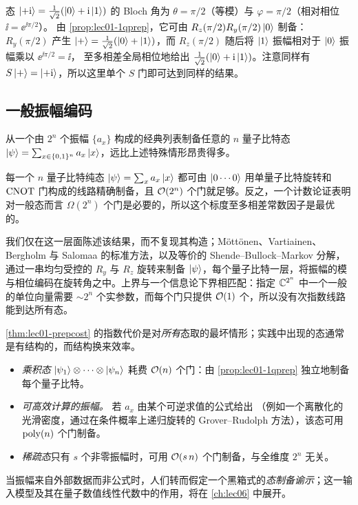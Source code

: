 \begin{example}[制备 $\ket{+\ii}$]\label{exa:lec01-prepplusi}
态 $\ket{+\mathrm{i}}=\tfrac{1}{\sqrt2}(\ket{0}+\mathrm{i}\ket{1})$ 的 Bloch 角为
$\theta=\pi/2$（等模）与 $\varphi=\pi/2$（相对相位 $\ii=\ee^{\ii\pi/2}$）。
由 \cref{prop:lec01-1qprep}，它可由 $R_{z}(\pi/2)R_{y}(\pi/2)\ket{0}$ 制备：
$R_{y}(\pi/2)$ 产生 $\ket{+}=\tfrac{1}{\sqrt2}(\ket{0}+\ket{1})$，而
$R_{z}(\pi/2)$ 随后将 $\ket{1}$ 振幅相对于 $\ket{0}$ 振幅乘以 $\ee^{\ii\pi/2}=\ii$，
至多相差全局相位地给出 $\tfrac{1}{\sqrt2}(\ket{0}+\mathrm{i}\ket{1})$。注意同样有
$S\ket{+}=\ket{+\mathrm{i}}$，所以这里单个 $S$ 门即可达到同样的结果。
\end{example}

\subsection{一般振幅编码}

从一个由 $2^{n}$ 个振幅 $\{a_{x}\}$ 构成的经典列表制备任意的 $n$ 量子比特态 $\ket{\psi}=\sum_{x\in\{0,1\}^{n}}a_{x}\ket{x}$，远比上述特殊情形昂贵得多。

\begin{theorem}[精确振幅编码的代价]\label{thm:lec01-prepcost}
每一个 $n$ 量子比特纯态 $\ket{\psi}=\sum_{x}a_{x}\ket{x}$ 都可由 $\ket{0\cdots0}$ 用单量子比特旋转和 $\mathrm{CNOT}$ 门构成的线路精确制备，且 $\mathcal{O}(2^{n})$ 个门就足够。反之，一个计数论证表明对一般态而言 $\Omega(2^{n})$ 个门是必要的，所以这个标度至多相差常数因子是最优的。
\end{theorem}

我们仅在这一层面陈述该结果，而不复现其构造；Möttönen、Vartiainen、Bergholm 与 Salomaa 的标准方法，以及等价的 Shende--Bullock--Markov 分解，通过一串均匀受控的 $R_{y}$ 与 $R_{z}$ 旋转来制备 $\ket{\psi}$，每个量子比特一层，将振幅的模与相位编码在旋转角之中。上界与一个信息论下界相匹配：指定 $\mathbb{C}^{2^{n}}$ 中一个一般的单位向量需要 $\sim 2^{n}$ 个实参数，而每个门只提供 $\mathcal{O}(1)$ 个，所以没有次指数线路能到达所有态。

\begin{remark}[高效的特殊情形]\label{rem:lec01-prepefficient}
\cref{thm:lec01-prepcost} 的指数代价是对\emph{所有}态取的最坏情形；实践中出现的态通常是有结构的，而结构换来效率。
\begin{itemize}[nosep]
  \item \emph{乘积态} $\ket{\psi_{1}}\otimes\cdots\otimes\ket{\psi_{n}}$ 耗费
        $\mathcal{O}(n)$ 个门：由 \cref{prop:lec01-1qprep} 独立地制备每个量子比特。
  \item \emph{可高效计算的振幅。} 若 $a_{x}$ 由某个可逆求值的公式给出
        （例如一个离散化的光滑密度，通过在条件概率上递归旋转的 Grover--Rudolph 方法），该态可用 $\operatorname{poly}(n)$ 个门制备。
  \item \emph{稀疏态}只有 $s$ 个非零振幅时，可用
        $\mathcal{O}(s\,n)$ 个门制备，与全维度 $2^{n}$ 无关。
\end{itemize}
当振幅来自外部数据而非公式时，人们转而假定一个黑箱式的\emph{态制备谕示}；这一输入模型及其在量子数值线性代数中的作用，将在 \cref{ch:lec06} 中展开。
\end{remark}


